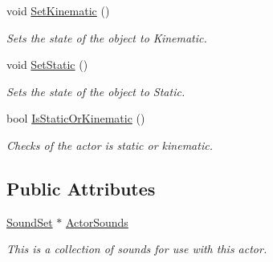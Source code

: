 \begin{DoxyCompactItemize}
void \hyperlink{classphys_1_1ActorBase_acd5613286ec14fb2a8e5ed5f5003dc5f}{SetKinematic} ()
\begin{DoxyCompactList}\small\item\em Sets the state of the object to Kinematic. \item\end{DoxyCompactList}\item 
void \hyperlink{classphys_1_1ActorBase_af0219532fe71d1d84042a20a88fe5037}{SetStatic} ()
\begin{DoxyCompactList}\small\item\em Sets the state of the object to Static. \item\end{DoxyCompactList}\item 
bool \hyperlink{classphys_1_1ActorBase_a0758873d315a0f70871649493d78d739}{IsStaticOrKinematic} ()
\begin{DoxyCompactList}\small\item\em Checks of the actor is static or kinematic. \item\end{DoxyCompactList}\end{DoxyCompactItemize}
\subsection*{Public Attributes}
\begin{DoxyCompactItemize}
\item 
\hypertarget{classphys_1_1ActorBase_a2d56e2b3470bfc7dfc6d9ce8c4158d81}{
\hyperlink{namespacephys_ab780c3162da5699fe421f3739ba03fc4}{SoundSet} $\ast$ \hyperlink{classphys_1_1ActorBase_a2d56e2b3470bfc7dfc6d9ce8c4158d81}{ActorSounds}}
\label{d8/d0f/classphys_1_1ActorBase_a2d56e2b3470bfc7dfc6d9ce8c4158d81}

\begin{DoxyCompactList}\small\item\em This is a collection of sounds for use with this actor. \item\end{DoxyCompactList}\end{DoxyCompactItemize}
